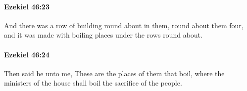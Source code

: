 		\paragraph{Ezekiel 46:23} %
			\label{EZEKIEL-46-23}

			And there was a row of building round about in them, round about them four, and it was made with boiling places under the rows round about.


		\paragraph{Ezekiel 46:24} %
			\label{EZEKIEL-46-24}

			Then said he unto me, These are the places of them that boil, where the ministers of the house shall boil the sacrifice of the people.

